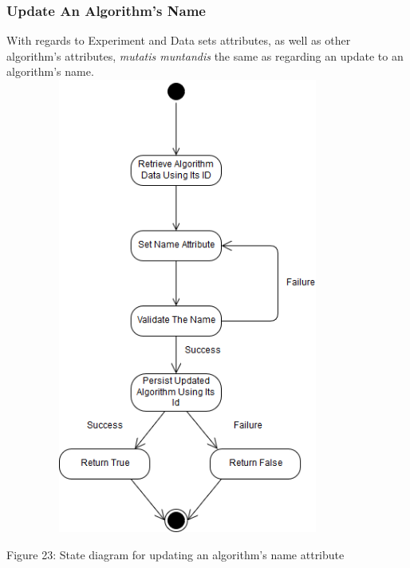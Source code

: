     \subsubsection{Update An Algorithm's Name}
    \par With regards to Experiment and Data sets attributes, as well as other algorithm's attributes,
    { \textit{mutatis muntandis} the same as regarding an update to an algorithm's name.} \newline \newline
    \includegraphics[width=12cm,height=15cm,keepaspectratio]{input_unit/images/update_algorithm_state_diagram.png}
    \begin{center}
    	\small{Figure 23: State diagram for updating an algorithm's name attribute }
    \end{center}
	\newpage
